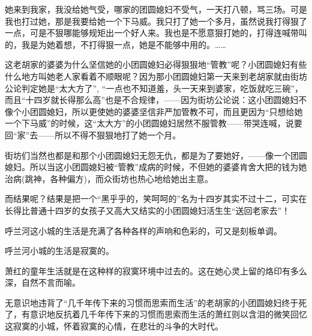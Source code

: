 \par 她来到我家，我没给她气受，哪家的团圆媳妇不受气，一天打八顿，骂三场。可是我也打过她，那是我要给她一个下马威。我只打了她一个多月，虽然说我打得狠了一点，可是不狠哪能够规矩出一个好人来。我也是不愿意狠打她的，打得连喊带叫的，我是为她着想，不打得狠一点，她是不能够中用的。……
\par 这老胡家的婆婆为什么坚信她的小团圆媳妇必得狠狠地“管教”呢？小团圆媳妇有些什么地方叫她老人家看着不顺眼呢？因为那小团圆媳妇第一天来到老胡家就由街坊公论判定她是“太大方了”, “一点也不知道羞，头一天来到婆家，吃饭就吃三碗”，而且“十四岁就长得那么高”也是不合规律，——因为街坊公论说：这小团圆媳妇不像个小团圆媳妇，所以更使她的婆婆坚信非严加管教不可，而且更因为“只想给她一个下马威”的时候，这“太大方”的小团圆媳妇居然不服管教——带哭连喊，说要回“家”去——所以不得不狠狠地打了她一个月。
\par 街坊们当然也都是和那个小团圆媳妇无怨无仇，都是为了要她好，——像一个团圆媳妇。所以当这小团圆媳妇被“管教”成病的时候，不但她的婆婆肯舍大把的钱为她治病(跳神，各种偏方)，而众街坊也热心地给她出主意。
\par 而结果呢？结果是把一个“黑乎乎的，笑呵呵的”名为十四岁其实不过十二，可实在长得比普通十四岁的女孩子又高大又结实的小团圆媳妇活生生“送回老家去”！
\par 呼兰河这小城的生活是充满了各种各样的声响和色彩的，可又是刻板单调。
\par 呼兰河小城的生活是寂寞的。
\par 萧红的童年生活就是在这种样的寂寞环境中过去的。这在她心灵上留的烙印有多么深，自然不言而喻。
\par 无意识地违背了“几千年传下来的习惯而思索而生活”的老胡家的小团圆媳妇终于死了，有意识地反抗着几千年传下来的习惯而思索而生活的萧红则以含泪的微笑回忆这寂寞的小城，怀着寂寞的心情，在悲壮的斗争的大时代。
